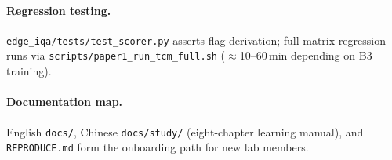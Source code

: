 \paragraph{Regression testing.}
\texttt{edge\_iqa/tests/test\_scorer.py} asserts flag derivation; full matrix regression runs via \texttt{scripts/paper1\_run\_tcm\_full.sh} ($\approx$10--60\,min depending on B3 training).

\paragraph{Documentation map.}
English \texttt{docs/}, Chinese \texttt{docs/study/} (eight-chapter learning manual), and \texttt{REPRODUCE.md} form the onboarding path for new lab members.
